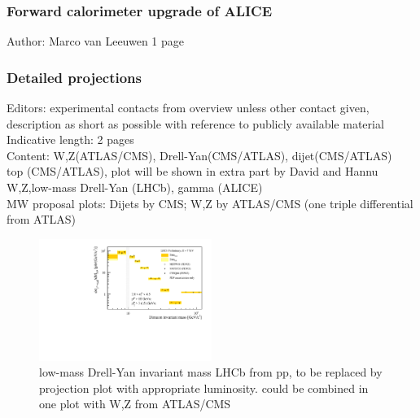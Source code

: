 \documentclass[../report.tex]{subfiles}
\begin{document}
\subsubsection{Forward calorimeter upgrade of ALICE}
Author: Marco van Leeuwen
1 page

\subsubsection{Detailed projections}
Editors: experimental contacts from overview unless other contact given, description as short as possible with reference to publicly available material \\
Indicative length: 2 pages \\
Content: W,Z(ATLAS/CMS), Drell-Yan(CMS/ATLAS), dijet(CMS/ATLAS)\\
top (CMS/ATLAS), plot will be shown in extra part by David and Hannu \\
W,Z,low-mass Drell-Yan (LHCb), gamma (ALICE) \\
MW proposal plots: Dijets by CMS; W,Z by ATLAS/CMS (one triple differential from ATLAS)\\
\begin{figure}[htb]
\centering
\includegraphics[width=0.5\textwidth]{figs/CSDYM2.pdf}
\caption{low-mass Drell-Yan invariant mass LHCb from pp, to be replaced by projection plot with appropriate luminosity. could be combined in one plot with W,Z from ATLAS/CMS}
\end{figure}
\end{document}

